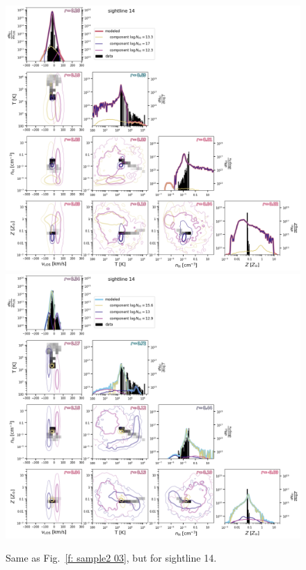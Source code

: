 \documentclass[fleqn,usenatbib]{mnras}
\begin{document}
\begin{figure}
    \centering
    \includegraphics[height=0.45\textheight]{figures/sample2/original/sightline_0014.png}
    \includegraphics[height=0.45\textheight]{figures/sample2/high-z/sightline_0014.png}
    \label{f: sample2 14}
    \caption{Same as Fig.~\ref{f: sample2 03}, but for sightline 14.}
\end{figure}
\end{document}
